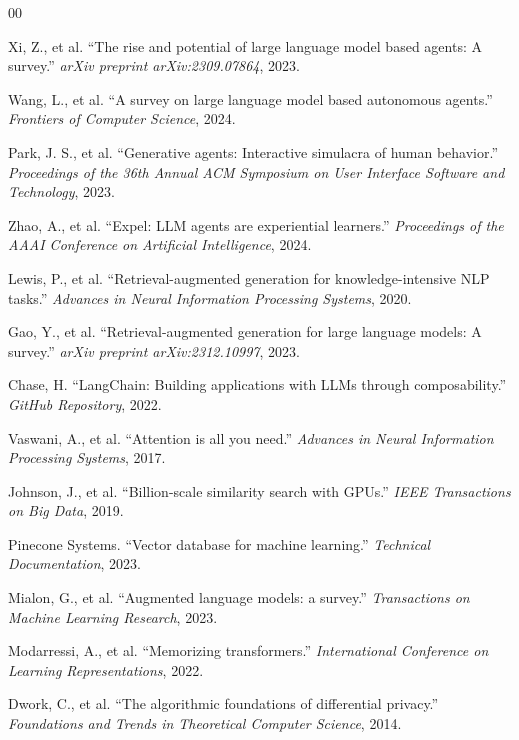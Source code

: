 \documentclass[conference]{IEEEtran}
\begin{document}
\begin{thebibliography}{00}

 Xi, Z., et al. ``The rise and potential of large language model based agents: A survey.'' \textit{arXiv preprint arXiv:2309.07864}, 2023.

 Wang, L., et al. ``A survey on large language model based autonomous agents.'' \textit{Frontiers of Computer Science}, 2024.

 Park, J. S., et al. ``Generative agents: Interactive simulacra of human behavior.'' \textit{Proceedings of the 36th Annual ACM Symposium on User Interface Software and Technology}, 2023.

 Zhao, A., et al. ``Expel: LLM agents are experiential learners.'' \textit{Proceedings of the AAAI Conference on Artificial Intelligence}, 2024.

 Lewis, P., et al. ``Retrieval-augmented generation for knowledge-intensive NLP tasks.'' \textit{Advances in Neural Information Processing Systems}, 2020.

 Gao, Y., et al. ``Retrieval-augmented generation for large language models: A survey.'' \textit{arXiv preprint arXiv:2312.10997}, 2023.

 Chase, H. ``LangChain: Building applications with LLMs through composability.'' \textit{GitHub Repository}, 2022.

 Vaswani, A., et al. ``Attention is all you need.'' \textit{Advances in Neural Information Processing Systems}, 2017.

 Johnson, J., et al. ``Billion-scale similarity search with GPUs.'' \textit{IEEE Transactions on Big Data}, 2019.

 Pinecone Systems. ``Vector database for machine learning.'' \textit{Technical Documentation}, 2023.

 Mialon, G., et al. ``Augmented language models: a survey.'' \textit{Transactions on Machine Learning Research}, 2023.

 Modarressi, A., et al. ``Memorizing transformers.'' \textit{International Conference on Learning Representations}, 2022.

 Dwork, C., et al. ``The algorithmic foundations of differential privacy.'' \textit{Foundations and Trends in Theoretical Computer Science}, 2014.


\end{thebibliography}
\end{document}
